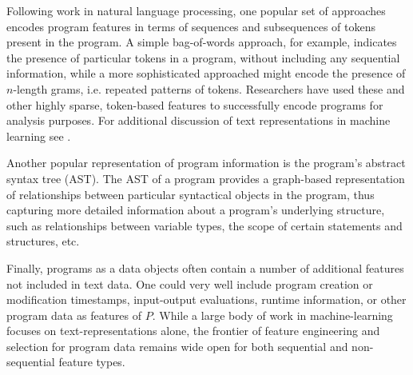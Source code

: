 \documentclass[sigconf]{acmart}
\begin{document}
Following work in natural language processing, one popular set of approaches encodes program features in terms of sequences and subsequences of tokens present in the program. A simple bag-of-words approach, for example, indicates the presence of particular tokens in a program, without including any sequential information, while a more sophisticated approached might encode the presence of $n$-length grams, i.e. repeated patterns of tokens. Researchers have used these and other highly sparse, token-based features to successfully encode programs for analysis purposes. For additional discussion of text representations in machine learning see \cite{allahyari2017text,ramya2017feature}.
 
Another popular representation of program information is the program's abstract syntax tree (AST). The AST of a program provides a graph-based representation of relationships between particular syntactical objects in the program, thus capturing more detailed information about a program's underlying structure, such as relationships between variable types, the scope of certain statements and structures, etc.


Finally, programs as a data objects often contain a number of additional features not included in text data. One could very well include program creation or modification timestamps, input-output evaluations, runtime information, or other program data as features of $P$. While a large body of work in machine-learning focuses on text-representations alone, the frontier of feature engineering and selection for program data remains wide open for both sequential and non-sequential feature types. 
\end{document}
